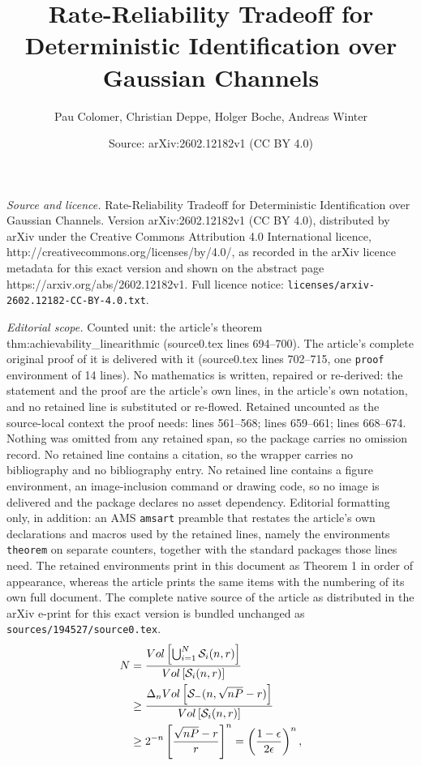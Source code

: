 \documentclass[10pt,a4paper]{amsart}
\title{Rate-Reliability Tradeoff for Deterministic Identification over Gaussian Channels}
\author{Pau Colomer, Christian Deppe, Holger Boche, Andreas Winter}
\date{Source: arXiv:2602.12182v1 (CC BY 4.0)}
\newcommand{\cS}{\mathcal{S}}
\begin{document}
\maketitle

\noindent\emph{Source and licence.} Rate-Reliability Tradeoff for Deterministic Identification over Gaussian Channels. Version arXiv:2602.12182v1 (CC BY 4.0), distributed by arXiv under the Creative Commons Attribution 4.0 International licence, http://creativecommons.org/licenses/by/4.0/, as recorded in the arXiv licence metadata for this exact version and shown on the abstract page https://arxiv.org/abs/2602.12182v1. Full licence notice: \texttt{licenses/arxiv-2602.12182-CC-BY-4.0.txt}.\par\smallskip

\noindent\textit{Editorial scope.} Counted unit: the article's theorem thm:achievability\_linearithmic (source0.tex lines 694--700). The article's complete original proof of it is delivered with it (source0.tex lines 702--715, one \texttt{proof} environment of 14 lines). No mathematics is written, repaired or re-derived: the statement and the proof are the article's own lines, in the article's own notation, and no retained line is substituted or re-flowed.  Retained uncounted as the source-local context the proof needs: lines 561--568; lines 659--661; lines 668--674.  Nothing was omitted from any retained span, so the package carries no omission record.  No retained line contains a citation, so the wrapper carries no bibliography and no bibliography entry.  No retained line contains a figure environment, an image-inclusion command or drawing code, so no image is delivered and the package declares no asset dependency.  Editorial formatting only, in addition: an AMS \texttt{amsart} preamble that restates the article's own declarations and macros used by the retained lines, namely the environments \texttt{theorem} on separate counters, together with the standard packages those lines need.  The retained environments print in this document as Theorem 1 in order of appearance, whereas the article prints the same items with the numbering of its own full document.  The complete native source of the article as distributed in the arXiv e-print for this exact version is bundled unchanged as \texttt{sources/194527/source0.tex}.
\begin{equation}
\label{eq:code_size}
\begin{split}
N&=\frac{\textsc{Vol}\left[\bigcup_{i=1}^N\cS_i(n,r)\right]}{\textsc{Vol}\left[\cS_i(n,r)\right]}\\
&\geq\frac{\Delta_n \textsc{Vol}\left[\cS_-(n,\sqrt{nP}-r)\right]}{\textsc{Vol}\left[\cS_i(n,r)\right]}\\
&\geq2^{-n}\left[\frac{\sqrt{nP}-r}{r}\right]^n=\left(\frac{1-\epsilon}{2\epsilon}\right)^n,
\end{split}
\end{equation}
\end{document}
